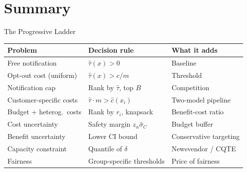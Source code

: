 \documentclass[aspectratio=169, 11pt, handout]{beamer}
\begin{document}
 
\section{Summary}
 
\begin{frame}{The Progressive Ladder}
 
\begin{center}
\small
\begin{tabular}{p{4.5cm}p{4cm}p{4cm}}
\toprule
\textbf{Problem} & \textbf{Decision rule} & \textbf{What it adds} \\
\midrule
Free notification & $\hat{\tau}(x) > 0$ & Baseline \\[0.3em]
Opt-out cost (uniform) & $\hat{\tau}(x) > c/m$ & Threshold \\[0.3em]
Notification cap & Rank by $\hat{\tau}$, top $B$ & Competition \\[0.3em]
Customer-specific costs & $\hat{\tau} \cdot m > \hat{c}(x_i)$ & Two-model pipeline \\[0.3em]
Budget + heterog.\ costs & Rank by $r_i$, knapsack & Benefit-cost ratio \\[0.3em]
Cost uncertainty & Safety margin $z_\alpha \hat{\sigma}_C$ & Budget buffer \\[0.3em]
Benefit uncertainty & Lower CI bound & Conservative targeting \\[0.3em]
Capacity constraint & Quantile of $\delta$ & Newsvendor / CQTE \\[0.3em]
Fairness & Group-specific thresholds & Price of fairness \\
\bottomrule
\end{tabular}
\end{center}
 
\end{frame}
 
\end{document}
